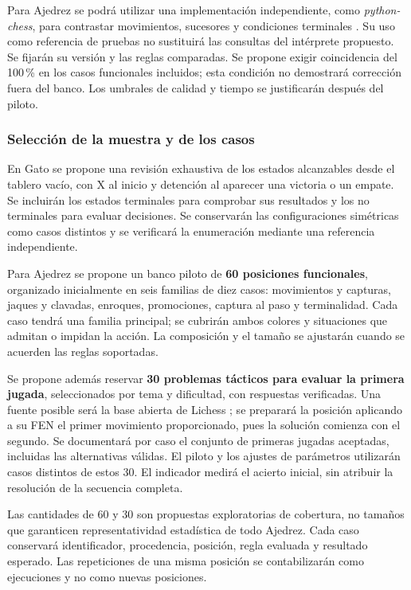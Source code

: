 \endgroup

Para Ajedrez se podrá utilizar una implementación independiente, como \textit{python-chess}, para contrastar movimientos, sucesores y condiciones terminales \cite{PythonChessCore}. Su uso como referencia de pruebas no sustituirá las consultas del intérprete propuesto. Se fijarán su versión y las reglas comparadas. Se propone exigir coincidencia del 100\,\% en los casos funcionales incluidos; esta condición no demostrará corrección fuera del banco. Los umbrales de calidad y tiempo se justificarán después del piloto.

\subsubsection{Selección de la muestra y de los casos}

En Gato se propone una revisión exhaustiva de los estados alcanzables desde el tablero vacío, con X al inicio y detención al aparecer una victoria o un empate. Se incluirán los estados terminales para comprobar sus resultados y los no terminales para evaluar decisiones. Se conservarán las configuraciones simétricas como casos distintos y se verificará la enumeración mediante una referencia independiente.

Para Ajedrez se propone un banco piloto de \textbf{60 posiciones funcionales}, organizado inicialmente en seis familias de diez casos: movimientos y capturas, jaques y clavadas, enroques, promociones, captura al paso y terminalidad. Cada caso tendrá una familia principal; se cubrirán ambos colores y situaciones que admitan o impidan la acción. La composición y el tamaño se ajustarán cuando se acuerden las reglas soportadas.

Se propone además reservar \textbf{30 problemas tácticos para evaluar la primera jugada}, seleccionados por tema y dificultad, con respuestas verificadas. Una fuente posible será la base abierta de Lichess \cite{LichessPuzzles}; se preparará la posición aplicando a su FEN el primer movimiento proporcionado, pues la solución comienza con el segundo. Se documentará por caso el conjunto de primeras jugadas aceptadas, incluidas las alternativas válidas. El piloto y los ajustes de parámetros utilizarán casos distintos de estos 30. El indicador medirá el acierto inicial, sin atribuir la resolución de la secuencia completa.

Las cantidades de 60 y 30 son propuestas exploratorias de cobertura, no tamaños que garanticen representatividad estadística de todo Ajedrez. Cada caso conservará identificador, procedencia, posición, regla evaluada y resultado esperado. Las repeticiones de una misma posición se contabilizarán como ejecuciones y no como nuevas posiciones.

